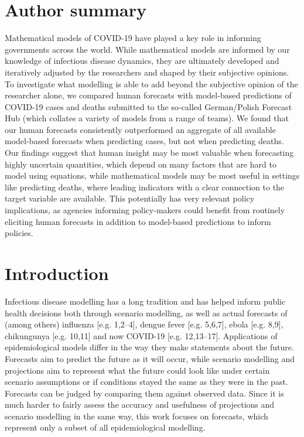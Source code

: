 \documentclass[10pt,letterpaper]{article}
\begin{document}
\section*{Author summary}
Mathematical models of COVID-19 have played a key role in informing
governments across the world. While mathematical models are informed by
our knowledge of infectious disease dynamics, they are ultimately
developed and iteratively adjusted by the researchers and shaped by
their subjective opinions. To investigate what modelling is able to add
beyond the subjective opinion of the researcher alone, we compared human
forecasts with model-based predictions of COVID-19 cases and deaths
submitted to the so-called German/Polish Forecast Hub (which collates a
variety of models from a range of teams). \textbar{} We found that our
human forecasts consistently outperformed an aggregate of all available
model-based forecasts when predicting cases, but not when predicting
deaths. Our findings suggest that human insight may be most valuable
when forecasting highly uncertain quantities, which depend on many
factors that are hard to model using equations, while mathematical
models may be most useful in settings like predicting deaths, where
leading indicators with a clear connection to the target variable are
available. This potentially has very relevant policy implications, as
agencies informing policy-makers could benefit from routinely eliciting
human forecasts in addition to model-based predictions to inform
policies.

\linenumbers

\hypertarget{introduction}{%
\section{Introduction}\label{introduction}}

Infectious disease modelling has a long tradition and has helped inform
public health decisions both through scenario modelling, as well as
actual forecasts of (among others) influenza {[}e.g. 1,2--4{]}, dengue
fever {[}e.g. 5,6,7{]}, ebola {[}e.g. 8,9{]}, chikungunya {[}e.g.
10,11{]} and now COVID-19 {[}e.g. 12,13--17{]}. Applications of
epidemiological models differ in the way they make statements about the
future. Forecasts aim to predict the future as it will occur, while
scenario modelling and projections aim to represent what the future
could look like under certain scenario assumptions or if conditions
stayed the same as they were in the past. Forecasts can be judged by
comparing them against observed data. Since it is much harder to fairly
assess the accuracy and usefulness of projections and scenario modelling
in the same way, this work focuses on forecasts, which represent only a
subset of all epidemiological modelling.
\end{document}
